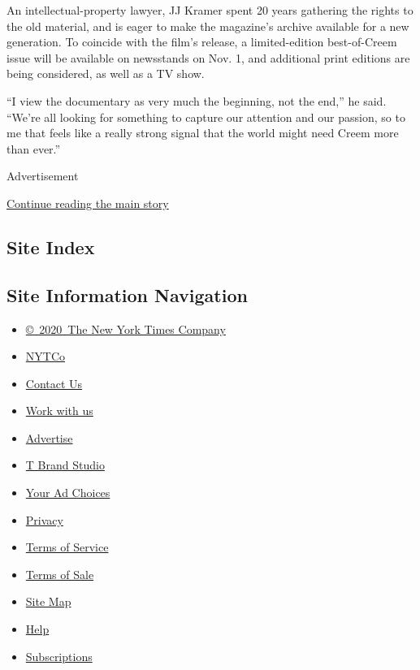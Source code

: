 An intellectual-property lawyer, JJ Kramer spent 20 years gathering the
rights to the old material, and is eager to make the magazine's archive
available for a new generation. To coincide with the film's release, a
limited-edition best-of-Creem issue will be available on newsstands on
Nov. 1, and additional print editions are being considered, as well as a
TV show.

``I view the documentary as very much the beginning, not the end,'' he
said. ``We're all looking for something to capture our attention and our
passion, so to me that feels like a really strong signal that the world
might need Creem more than ever.''

Advertisement

\protect\hyperlink{after-bottom}{Continue reading the main story}

\hypertarget{site-index}{%
\subsection{Site Index}\label{site-index}}

\hypertarget{site-information-navigation}{%
\subsection{Site Information
Navigation}\label{site-information-navigation}}

\begin{itemize}
\tightlist
\item
  \href{https://help.nytimes3xbfgragh.onion/hc/en-us/articles/115014792127-Copyright-notice}{©~2020~The
  New York Times Company}
\end{itemize}

\begin{itemize}
\tightlist
\item
  \href{https://www.nytco.com/}{NYTCo}
\item
  \href{https://help.nytimes3xbfgragh.onion/hc/en-us/articles/115015385887-Contact-Us}{Contact
  Us}
\item
  \href{https://www.nytco.com/careers/}{Work with us}
\item
  \href{https://nytmediakit.com/}{Advertise}
\item
  \href{http://www.tbrandstudio.com/}{T Brand Studio}
\item
  \href{https://www.nytimes3xbfgragh.onion/privacy/cookie-policy\#how-do-i-manage-trackers}{Your
  Ad Choices}
\item
  \href{https://www.nytimes3xbfgragh.onion/privacy}{Privacy}
\item
  \href{https://help.nytimes3xbfgragh.onion/hc/en-us/articles/115014893428-Terms-of-service}{Terms
  of Service}
\item
  \href{https://help.nytimes3xbfgragh.onion/hc/en-us/articles/115014893968-Terms-of-sale}{Terms
  of Sale}
\item
  \href{https://spiderbites.nytimes3xbfgragh.onion}{Site Map}
\item
  \href{https://help.nytimes3xbfgragh.onion/hc/en-us}{Help}
\item
  \href{https://www.nytimes3xbfgragh.onion/subscription?campaignId=37WXW}{Subscriptions}
\end{itemize}
